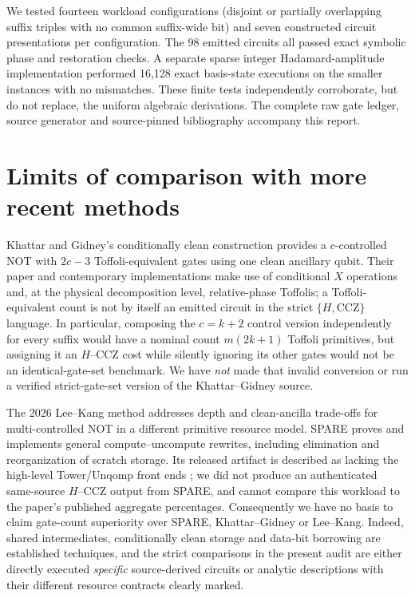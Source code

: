 \documentclass[11pt,a4paper]{article}
\begin{document}
We tested fourteen workload configurations (disjoint or partially overlapping suffix triples with no common suffix-wide bit) and seven constructed circuit presentations per configuration. The 98 emitted circuits all passed exact symbolic phase and restoration checks. A separate sparse integer Hadamard-amplitude implementation performed 16,128 exact basis-state executions on the smaller instances with no mismatches. These finite tests independently corroborate, but do not replace, the uniform algebraic derivations. The complete raw gate ledger, source generator and source-pinned bibliography accompany this report.

\section{Limits of comparison with more recent methods}
Khattar and Gidney's conditionally clean construction \cite{khattar} provides a $c$-controlled NOT with $2c-3$ Toffoli-equivalent gates using one clean ancillary qubit. Their paper and contemporary implementations make use of conditional $X$ operations and, at the physical decomposition level, relative-phase Toffolis; a Toffoli-equivalent count is not by itself an emitted circuit in the strict $\{H,\mathrm{CCZ}\}$ language. In particular, composing the $c=k+2$ control version independently for every suffix would have a nominal count $m(2k+1)$ Toffoli primitives, but assigning it an $H$--CCZ cost while silently ignoring its other gates would not be an identical-gate-set benchmark. We have \emph{not} made that invalid conversion or run a verified strict-gate-set version of the Khattar--Gidney source.

The 2026 Lee--Kang method \cite{lee} addresses depth and clean-ancilla trade-offs for multi-controlled NOT in a different primitive resource model. SPARE \cite{spare} proves and implements general compute--uncompute rewrites, including elimination and reorganization of scratch storage. Its released artifact is described as lacking the high-level Tower/Unqomp front ends \cite{spareartifact}; we did not produce an authenticated same-source $H$--CCZ output from SPARE, and cannot compare this workload to the paper's published aggregate percentages. Consequently we have no basis to claim gate-count superiority over SPARE, Khattar--Gidney or Lee--Kang. Indeed, shared intermediates, conditionally clean storage and data-bit borrowing are established techniques, and the strict comparisons in the present audit are either directly executed \emph{specific} source-derived circuits or analytic descriptions with their different resource contracts clearly marked.
\end{document}
